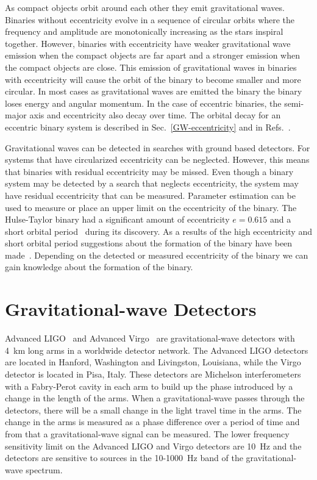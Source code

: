 As compact objects orbit around each other they emit gravitational waves. Binaries without eccentricity evolve in a sequence of circular orbits where the frequency and amplitude are monotonically increasing as the stars inspiral together. However, binaries with eccentricity have weaker gravitational wave emission when the compact objects are far apart and a stronger emission when the compact objects are close. This emission of gravitational waves in binaries with eccentricity will cause the orbit of the binary to become smaller and more circular. In most cases as gravitational waves are emitted the binary the binary loses energy and angular momentum. In the case of eccentric binaries, the semi-major axis and eccentricity also decay over time. The orbital decay for an eccentric binary system is described in Sec.~\ref{GW-eccentricity} and in Refs.~\cite{Peters:1963ux,Peters:1964zz}.

Gravitational waves can be detected in searches with ground based detectors. For systems that have circularized eccentricity can be neglected. However, this means that binaries with residual eccentricity may be missed. Even though a binary system may be detected by a search that neglects eccentricity, the system may have residual eccentricity that can be measured. Parameter estimation can be used to measure or place an upper limit on the eccentricity of the binary. The Hulse-Taylor binary had a significant amount of eccentricity $e=0.615$ and a short orbital period~\cite{Hulse:1974eb} during its discovery. As a results of the high eccentricity and short orbital period suggestions about the formation of the binary have been made~\cite{Flannery1975,DeLoore1975}. Depending on the detected or measured eccentricity of the binary we can gain knowledge about the formation of the binary. 

\section{Gravitational-wave Detectors}

Advanced LIGO~\cite{TheLIGOScientific:2014jea} and Advanced Virgo~\cite{TheVirgo:2014hva} are gravitational-wave detectors with 4~km long arms in a worldwide detector network. The Advanced LIGO detectors are located in Hanford, Washington and Livingston, Louisiana, while the Virgo detector is located in Pisa, Italy. These detectors are Michelson interferometers with a Fabry-Perot cavity in each arm to build up the phase introduced by a change in the length of the arms. When a gravitational-wave passes through the detectors, there will be a small change in the light travel time in the arms. The change in the arms is measured as a phase difference over a period of time and from that a gravitational-wave signal can be measured. The lower frequency sensitivity limit on the Advanced LIGO and Virgo detectors are 10~Hz and the detectors are sensitive to sources in the 10-1000~Hz band of the gravitational-wave spectrum. 

